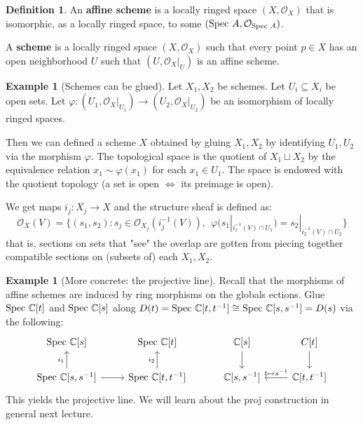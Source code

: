 \documentclass[10pt,reqno]{amsart}
\theoremstyle{definition}
\newtheorem{example}[theorem]{Example}
\newtheorem{definition}[theorem]{Definition}
\theoremstyle{remark}
\numberwithin{equation}{section}
\numberwithin{theorem}{section}
\newcommand{\C}{{\mathbb C}}
\newcommand{\OO}{{\mathcal O}}
\newcommand{\spec}{\textup{Spec }}
\begin{document}
\begin{definition} An \textbf{affine scheme} is a locally ringed space $(X,\OO_X)$ that is isomorphic, as a locally ringed space, to some $(\spec A, \OO_{\spec A})$.

A \textbf{scheme} is a locally ringed space $(X,\OO_X)$ such that every point $p \in X$ has an open neighborhood $U$ such that $(U,\OO_X|_U)$ is an affine scheme.
\end{definition}

\begin{example}[Schemes can be glued] Let $X_1,X_2$ be schemes. Let $U_i \subseteq X_i$ be open sets. Let $\varphi: (U_1, \OO_X|_{U_1}) \to (U_2, \OO_{X}|_{U_2})$ be an isomorphism of locally ringed spaces.

Then we can defined a scheme $X$ obtained by gluing $X_1,X_2$ by identifying $U_1,U_2$ via the morphism $\varphi$. The topological space is the quotient of $X_1 \sqcup X_2$ by the equivalence relation $x_1 \sim \varphi(x_1)$ for each $x_1 \in U_1$. The space is endowed with the quotient topology (a set is open $\iff$ its preimage is open).

We get maps $i_j: X_j \to X$ and the structure sheaf is defined as:
\[\OO_X(V) = \{(s_1,s_2) : s_j \in \OO_{X_j}(i_j^{-1}(V)), \ \   \varphi(s_1|_{i_1^{-1}(V) \cap U_1}) = s_2|_{i_2^{-1}(V) \cap U_2} \}\]
that is, sections on sets that "see" the overlap are gotten from piecing together compatible sections on (subsets of) each $X_1,X_2$.
\end{example}

\begin{example}[More concrete: the projective line] Recall that the morphisms of affine schemes are induced by ring morphisms on the globals ections. Glue $\spec \C[t]$ and $\spec \C[s]$ along $D(t) = \spec \C[t,t^{-1}] \cong \spec \C[s,s^{-1}] = D(s)$ via the following:
\[\begin{tikzcd}
\spec \C[s] & \spec \C[t]\\
\spec \C[s,s^{-1}] \arrow[u,"i_1"] \arrow[r]& \spec \C[t,t^{-1}] \arrow[u,"i_2"]
\end{tikzcd} \quad \quad \quad
\begin{tikzcd}
\C[s] \arrow[d]& C[t] \arrow[d] \\
\C[s,s^{-1}] &  \C[t,t^{-1}] \arrow[l, swap, "t \mapsto s^{-1}"] 
\end{tikzcd}\]
This yields the projective line. We will learn about the proj construction in general next lecture.
\end{example}
\end{document}
